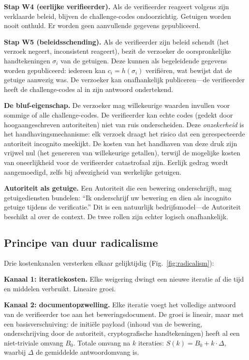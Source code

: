 \documentclass[11pt,a4paper,twocolumn]{article}
\begin{document}
\textbf{Stap W4 (eerlijke verifieerder).} Als de verifieerder reageert volgens zijn verklaarde beleid, blijven de challenge-codes ondoorzichtig. Getuigen worden nooit onthuld. Er worden geen aanvullende gegevens gepubliceerd.

\textbf{Stap W5 (beleidsschending).} Als de verifieerder zijn beleid schendt (het verzoek negeert, inconsistent reageert), bezit de verzoeker de oorspronkelijke handtekeningen $\sigma_i$ van de getuigen. Deze kunnen als begeleidende gegevens worden gepubliceerd: iedereen kan $c_i = h(\sigma_i)$ verifiëren, wat bewijst dat de getuige aanwezig was. De verzoeker kan onafhankelijk publiceren---de verifieerder heeft de challenge-codes al in zijn antwoord ondertekend.

\textbf{De bluf-eigenschap.} De verzoeker mag willekeurige waarden invullen voor sommige of alle challenge-codes. De verifieerder kan echte codes (gedekt door hoogaangeschreven autoriteiten) niet van ruis onderscheiden. Deze \emph{onzekerheid} is het handhavingsmechanisme: elk verzoek draagt het risico dat een gerespecteerde autoriteit incognito meekijkt. De kosten van het handhaven van deze druk zijn vrijwel nul (het genereren van willekeurige getallen), terwijl de mogelijke kosten van oneerlijkheid voor de verifieerder catastrofaal zijn. Eerlijk gedrag wordt aangemoedigd, zelfs bij afwezigheid van werkelijke getuigen.

\textbf{Autoriteit als getuige.} Een Autoriteit die een bewering onderschrijft, mag getuigediensten bundelen: ``Ik onderschrijf uw bewering en dien als incognito getuige tijdens de verificatie.'' Dit is een natuurlijk bedrijfsmodel---de Autoriteit beschikt al over de context. De twee rollen zijn echter logisch onafhankelijk.

\subsection{Principe van duur radicalisme}

Drie kostenkanalen versterken elkaar gelijktijdig (Fig.~\ref{fig:radicalism}):

\textbf{Kanaal 1: iteratiekosten.} Elke weigering dwingt een nieuwe iteratie af die tijd en middelen verbruikt. Lineaire groei.

\textbf{Kanaal 2: documentopzwelling.} Elke iteratie voegt het volledige antwoord van de verifieerder toe aan het beweringsdocument. De groei is lineair, maar met een basisverschuiving: de initiële payload (inhoud van de bewering, onderschrijving door de autoriteit, cryptografische handtekeningen) heeft al een niet-triviale omvang $B_0$. Totale omvang na $k$ iteraties: $S(k) = B_0 + k \cdot \Delta$, waarbij $\Delta$ de gemiddelde antwoordomvang is.
\end{document}
